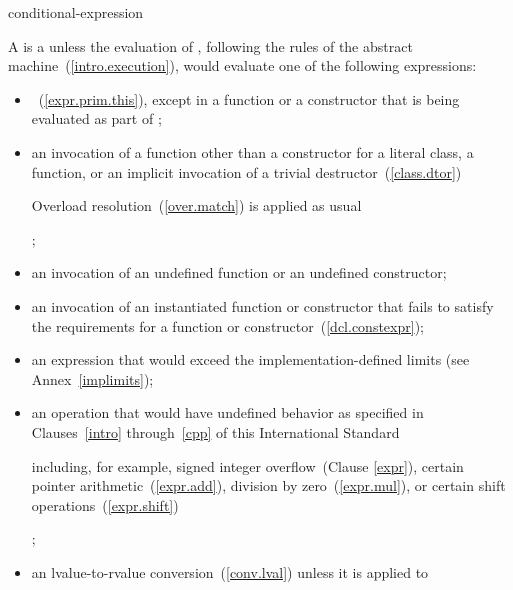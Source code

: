 \begin{bnf}
\br
    conditional-expression
\end{bnf}

\pnum
A   is a
unless the evaluation of , following the rules of the abstract
machine~(\ref{intro.execution}), would evaluate one of the following expressions:

\begin{itemize}
\item
{}~(\ref{expr.prim.this}), except in a 
function or a  constructor that is being evaluated as part
of ;

\item
an invocation of a function other than
a  constructor for a literal class,
a  function,
or an implicit invocation of a trivial destructor~(\ref{class.dtor})
\begin{note} Overload resolution~(\ref{over.match})
is applied as usual \end{note};

\item
an invocation of an undefined  function or an
undefined  constructor;

\item
an invocation of an instantiated  function or
 constructor that fails to satisfy the requirements
for a  function or
 constructor~(\ref{dcl.constexpr});

\item
an expression that would exceed the implementation-defined
limits (see Annex~\ref{implimits});

\item
an operation that would have undefined behavior
as specified in Clauses~\ref{intro} through~\ref{cpp}
of this International Standard \begin{note} including,
for example, signed integer overflow~(Clause \ref{expr}), certain
pointer arithmetic~(\ref{expr.add}), division by
zero~(\ref{expr.mul}), or certain shift operations~(\ref{expr.shift})
\end{note};

\item
an lvalue-to-rvalue conversion~(\ref{conv.lval}) unless
it is applied to


\end{itemize}
